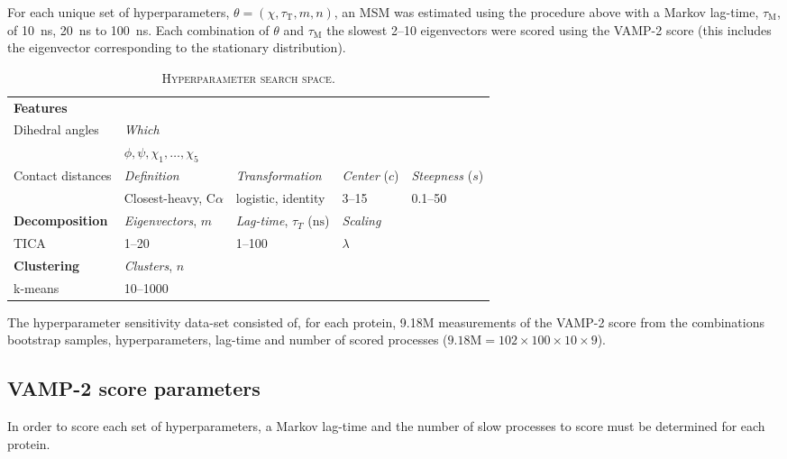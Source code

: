 \documentclass[journal=jacsat,manuscript=article]{achemso}
\begin{document}
For each unique set of hyperparameters, $\theta = (\chi, \tau_{\mathrm{T}}, m, n)$,  an MSM was estimated using the procedure above with a Markov lag-time, $\tau_{\mathrm{M}}$, of \SI{10}{\nano\second}, \SI{20}{\nano\second} to \SI{100}{\nano\second}. Each combination of $\theta$ and  $\tau_{\mathrm{M}}$ the slowest \numrange{2}{10} eigenvectors were scored using the VAMP-2 score (this includes the eigenvector corresponding to the stationary distribution). 

\begin{table}
    \centering
    \begin{tabularx}{\textwidth}{lXXXX}
    \toprule
    \textbf{Features}  & & & &\\
    Dihedral angles & \emph{Which} & & &\\
    & $\phi, \psi, \chi_{1}, \ldots, \chi_{5}$ & & & \\
    Contact distances &  \emph{Definition} & \emph{Transformation}& \emph{Center} ($c$) & \emph{Steepness} ($s$) \\

     & Closest-heavy, C$\alpha$ & logistic, identity &  \numrange{3}{15} & \numrange{0.1}{50} \\
    \midrule
    \textbf{Decomposition} & \emph{Eigenvectors}, $m$ & \emph{Lag-time}, $\tau_{T}$ ($\si{\nano\second}$) & \emph{Scaling}\\ 
    TICA & \numrange{1}{20} & \numrange{1}{100} & $\lambda$\\
    \midrule
    \textbf{Clustering} & \emph{Clusters}, $n$ &\\
    k-means & \numrange{10}{1000} & \\
    \bottomrule
    \end{tabularx}
    \caption{\textsc{Hyperparameter search space}. }
    \label{tab:search_space}
\end{table}

The hyperparameter sensitivity data-set consisted of, for each protein, 9.18M measurements of the VAMP-2 score from the combinations bootstrap samples, hyperparameters, lag-time and number of scored processes  ($9.18\mathrm{M}=102 \times 100 \times 10 \times 9$). 

\subsection{VAMP-2 score parameters}
In order to score each set of hyperparameters, a Markov lag-time and the number of slow processes to score must be determined for each protein. 
\end{document}
